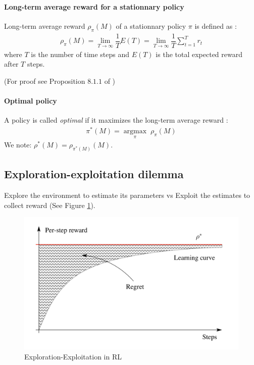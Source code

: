 \documentclass{article}
\newcommand{\argmax}[1]{\underset{#1}{\operatorname{argmax}}\;}
\begin{document}
\paragraph{Long-term average reward for a stationnary policy\\}
Long-term average reward $\rho_{\pi}(M)$ of a stationnary policy $\pi$ is defined as :
\begin{align*}
\rho_{\pi}(M) = \lim\limits_{T \rightarrow \infty} \dfrac{1}{T}E(T) = \lim\limits_{T \rightarrow \infty} \dfrac{1}{T}\sum\limits_{t = 1}^{T} r_t
\end{align*}
where $T$ is the number of time steps and
$E(T)$ is the total expected reward after $T$ steps.

(For proof see Proposition $8.1.1$ of \cite{puterman2014markov})

\paragraph{Optimal policy\\}
A policy is called \textit{optimal} if it maximizes the long-term average reward :
\begin{align*}
\pi^{*}(M) =  \argmax{\pi} \rho_{\pi}(M)
\end{align*}
We note: $\rho^{*}(M) = \rho_{\pi^{*}(M)}(M)$.

\subsection{Exploration-exploitation dilemma}
Explore the environment to estimate its parameters vs Exploit the estimates to collect reward (See Figure \ref{fig:regret}).

\begin{figure}[h]
	\includegraphics[width=\textwidth]{regret.png}
   \caption{Exploration-Exploitation in RL}
   \label{fig:regret}
\end{figure}
\end{document}
